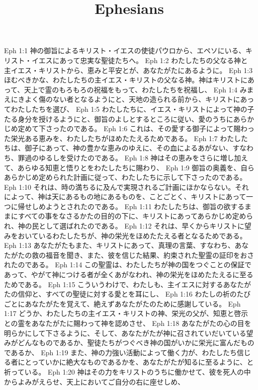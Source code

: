 

\title{Ephesians}

Eph 1:1  神の御旨によるキリスト・イエスの使徒パウロから、エペソにいる、キリスト・イエスにあって忠実な聖徒たちへ。
Eph 1:2  わたしたちの父なる神と主イエス・キリストから、恵みと平安とが、あなたがたにあるように。
Eph 1:3  ほむべきかな、わたしたちの主イエス・キリストの父なる神。神はキリストにあって、天上で霊のもろもろの祝福をもって、わたしたちを祝福し、
Eph 1:4  みまえにきよく傷のない者となるようにと、天地の造られる前から、キリストにあってわたしたちを選び、
Eph 1:5  わたしたちに、イエス・キリストによって神の子たる身分を授けるようにと、御旨のよしとするところに従い、愛のうちにあらかじめ定めて下さったのである。
Eph 1:6  これは、その愛する御子によって賜わった栄光ある恵みを、わたしたちがほめたたえるためである。
Eph 1:7  わたしたちは、御子にあって、神の豊かな恵みのゆえに、その血によるあがない、すなわち、罪過のゆるしを受けたのである。
Eph 1:8  神はその恵みをさらに増し加えて、あらゆる知恵と悟りとをわたしたちに賜わり、
Eph 1:9  御旨の奥義を、自らあらかじめ定められた計画に従って、わたしたちに示して下さったのである。
Eph 1:10  それは、時の満ちるに及んで実現されるご計画にほかならない。それによって、神は天にあるもの地にあるものを、ことごとく、キリストにあって一つに帰せしめようとされたのである。
Eph 1:11  わたしたちは、御旨の欲するままにすべての事をなさるかたの目的の下に、キリストにあってあらかじめ定められ、神の民として選ばれたのである。
Eph 1:12  それは、早くからキリストに望みをおいているわたしたちが、神の栄光をほめたたえる者となるためである。
Eph 1:13  あなたがたもまた、キリストにあって、真理の言葉、すなわち、あなたがたの救の福音を聞き、また、彼を信じた結果、約束された聖霊の証印をおされたのである。
Eph 1:14  この聖霊は、わたしたちが神の国をつぐことの保証であって、やがて神につける者が全くあがなわれ、神の栄光をほめたたえるに至るためである。
Eph 1:15  こういうわけで、わたしも、主イエスに対するあなたがたの信仰と、すべての聖徒に対する愛とを耳にし、
Eph 1:16  わたしの祈のたびごとにあなたがたを覚えて、絶えずあなたがたのために感謝している。
Eph 1:17  どうか、わたしたちの主イエス・キリストの神、栄光の父が、知恵と啓示との霊をあなたがたに賜わって神を認めさせ、
Eph 1:18  あなたがたの心の目を明らかにして下さるように、そして、あなたがたが神に召されていだいている望みがどんなものであるか、聖徒たちがつぐべき神の国がいかに栄光に富んだものであるか、
Eph 1:19  また、神の力強い活動によって働く力が、わたしたち信じる者にとっていかに絶大なものであるかを、あなたがたが知るに至るように、と祈っている。
Eph 1:20  神はその力をキリストのうちに働かせて、彼を死人の中からよみがえらせ、天上においてご自分の右に座せしめ、
